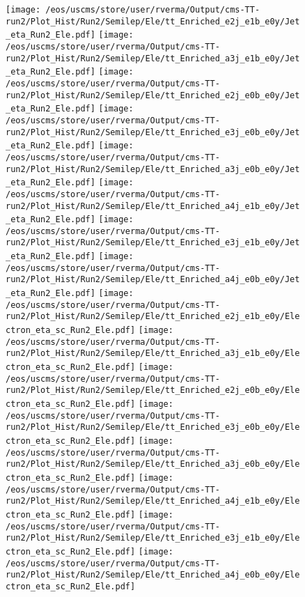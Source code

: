\begin{figure}
\centering
\texttt{[image: /eos/uscms/store/user/rverma/Output/cms-TT-run2/Plot\_Hist/Run2/Semilep/Ele/tt\_Enriched\_e2j\_e1b\_e0y/Jet\_eta\_Run2\_Ele.pdf]}
\texttt{[image: /eos/uscms/store/user/rverma/Output/cms-TT-run2/Plot\_Hist/Run2/Semilep/Ele/tt\_Enriched\_a3j\_e1b\_e0y/Jet\_eta\_Run2\_Ele.pdf]}
\texttt{[image: /eos/uscms/store/user/rverma/Output/cms-TT-run2/Plot\_Hist/Run2/Semilep/Ele/tt\_Enriched\_e2j\_e0b\_e0y/Jet\_eta\_Run2\_Ele.pdf]}
\texttt{[image: /eos/uscms/store/user/rverma/Output/cms-TT-run2/Plot\_Hist/Run2/Semilep/Ele/tt\_Enriched\_e3j\_e0b\_e0y/Jet\_eta\_Run2\_Ele.pdf]}
\texttt{[image: /eos/uscms/store/user/rverma/Output/cms-TT-run2/Plot\_Hist/Run2/Semilep/Ele/tt\_Enriched\_a3j\_e0b\_e0y/Jet\_eta\_Run2\_Ele.pdf]}
\texttt{[image: /eos/uscms/store/user/rverma/Output/cms-TT-run2/Plot\_Hist/Run2/Semilep/Ele/tt\_Enriched\_a4j\_e1b\_e0y/Jet\_eta\_Run2\_Ele.pdf]}
\texttt{[image: /eos/uscms/store/user/rverma/Output/cms-TT-run2/Plot\_Hist/Run2/Semilep/Ele/tt\_Enriched\_e3j\_e1b\_e0y/Jet\_eta\_Run2\_Ele.pdf]}
\texttt{[image: /eos/uscms/store/user/rverma/Output/cms-TT-run2/Plot\_Hist/Run2/Semilep/Ele/tt\_Enriched\_a4j\_e0b\_e0y/Jet\_eta\_Run2\_Ele.pdf]}
\texttt{[image: /eos/uscms/store/user/rverma/Output/cms-TT-run2/Plot\_Hist/Run2/Semilep/Ele/tt\_Enriched\_e2j\_e1b\_e0y/Electron\_eta\_sc\_Run2\_Ele.pdf]}
\texttt{[image: /eos/uscms/store/user/rverma/Output/cms-TT-run2/Plot\_Hist/Run2/Semilep/Ele/tt\_Enriched\_a3j\_e1b\_e0y/Electron\_eta\_sc\_Run2\_Ele.pdf]}
\texttt{[image: /eos/uscms/store/user/rverma/Output/cms-TT-run2/Plot\_Hist/Run2/Semilep/Ele/tt\_Enriched\_e2j\_e0b\_e0y/Electron\_eta\_sc\_Run2\_Ele.pdf]}
\texttt{[image: /eos/uscms/store/user/rverma/Output/cms-TT-run2/Plot\_Hist/Run2/Semilep/Ele/tt\_Enriched\_e3j\_e0b\_e0y/Electron\_eta\_sc\_Run2\_Ele.pdf]}
\texttt{[image: /eos/uscms/store/user/rverma/Output/cms-TT-run2/Plot\_Hist/Run2/Semilep/Ele/tt\_Enriched\_a3j\_e0b\_e0y/Electron\_eta\_sc\_Run2\_Ele.pdf]}
\texttt{[image: /eos/uscms/store/user/rverma/Output/cms-TT-run2/Plot\_Hist/Run2/Semilep/Ele/tt\_Enriched\_a4j\_e1b\_e0y/Electron\_eta\_sc\_Run2\_Ele.pdf]}
\texttt{[image: /eos/uscms/store/user/rverma/Output/cms-TT-run2/Plot\_Hist/Run2/Semilep/Ele/tt\_Enriched\_e3j\_e1b\_e0y/Electron\_eta\_sc\_Run2\_Ele.pdf]}
\texttt{[image: /eos/uscms/store/user/rverma/Output/cms-TT-run2/Plot\_Hist/Run2/Semilep/Ele/tt\_Enriched\_a4j\_e0b\_e0y/Electron\_eta\_sc\_Run2\_Ele.pdf]}
\end{figure}

